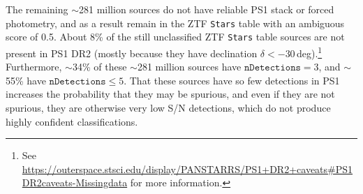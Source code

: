 \documentclass[twocolumn]{aastex63}
\begin{document}
The remaining $\sim$281 million sources do not have reliable PS1 stack or
forced photometry, and as a result remain in the ZTF \texttt{Stars} table with
an ambiguous score of 0.5. About 8\% of the still unclassified ZTF
\texttt{Stars} table sources are not present in PS1 DR2 (mostly because they
have declination $\delta < -30$\,deg).\footnote{See
\url{https://outerspace.stsci.edu/display/PANSTARRS/PS1+DR2+caveats\#PS1DR2caveats-Missingdata} for more information.} Furthermore, $\sim$34\% of these
$\sim$281 million sources have $\mathtt{nDetections} = 3$, and $\sim$55\% have
$\mathtt{nDetections} \le 5$. That these sources have so few detections in PS1
increases the probability that they may be spurious, and even if they are not
spurious, they are otherwise very low S/N detections, which do not produce
highly confident classifications.


% 
% 

\end{document}
